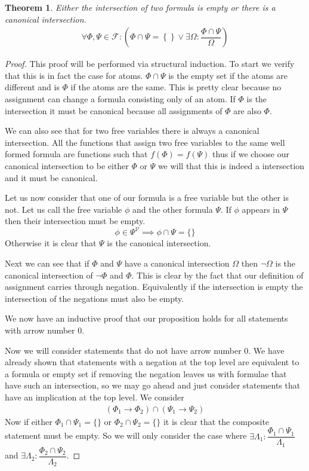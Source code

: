 \documentclass{article}
\newtheorem{thm}{Theorem}
\begin{document}
\begin{thm}
Either the intersection of two formula is empty or there is a canonical intersection.
\begin{align*}
\forall \Phi,\Psi \in \mathcal{F} : \left(\Phi \cap \Psi = \left\{\right\} \lor \exists \Omega : \dfrac{\Phi \cap \Psi}{\Omega} \right)
\end{align*}
\end{thm}
\begin{proof}
This proof will be performed via structural induction.
To start we verify that this is in fact the case for atoms.
$\Phi \cap \Psi$ is the empty set if the atoms are different and is $\Phi$ if the atoms are the same.
This is pretty clear because no assignment can change a formula consisting only of an atom.
If $\Phi$ is the intersection it must be canonical because all assignments of $\Phi$ are also $\Phi$.

We can also see that for two free variables there is always a canonical intersection.
All the functions that assign two free variables to the same well formed formula are functions such that $f(\Phi) = f(\Psi)$ thus if we choose
our canonical intersection to be either $\Phi$ or $\Psi$ we will that this is indeed a intersection and it must be canonical.

Let us now consider that one of our formula is a free variable but the other is not.
Let us call the free variable $\phi$ and the other formula $\Psi$.
If $\phi$ appears in $\Psi$ then their intersection must be empty.
\begin{equation*}
\phi\in\Psi^\mathcal{V}\implies\phi\cap\Psi=\{\}
\end{equation*}
Otherwise it is clear that $\Psi$ is the canonical intersection.

Next we can see that if $\Phi$ and $\Psi$ have a canonical intersection $\Omega$ then $\neg\Omega$ is the canonical intersection of $\neg\Phi$ and $\Phi$.
This is clear by the fact that our definition of assignment carries through negation.
Equivalently if the intersection is empty the intersection of the negations must also be empty.

We now have an inductive proof that our proposition holds for all statements with arrow number $0$.

Now we will consider statements that do not have arrow number $0$.
We have already shown that statements with a negation at the top level are equivalent to a formula or empty set if removing the negation leaves us with formulae that have such an intersection, so we may go ahead and just consider statements that have an implication at the top level.
We consider
\begin{align*}
(\Phi_1 \rightarrow \Phi_2) \cap (\Psi_1 \rightarrow \Psi_2)
\end{align*}
Now if either $\Phi_1 \cap \Psi_1 = \{\}$ or $\Phi_2 \cap \Psi_2 = \{\}$ it is clear that the composite statement must be empty.
So we will only consider the case where $\exists \Lambda_1 : \dfrac{\Phi_1 \cap \Psi_1}{\Lambda_1}$ and $\exists \Lambda_2 : \dfrac{\Phi_2 \cap \Psi_2}{\Lambda_2}$.


\end{proof}
\end{document}
